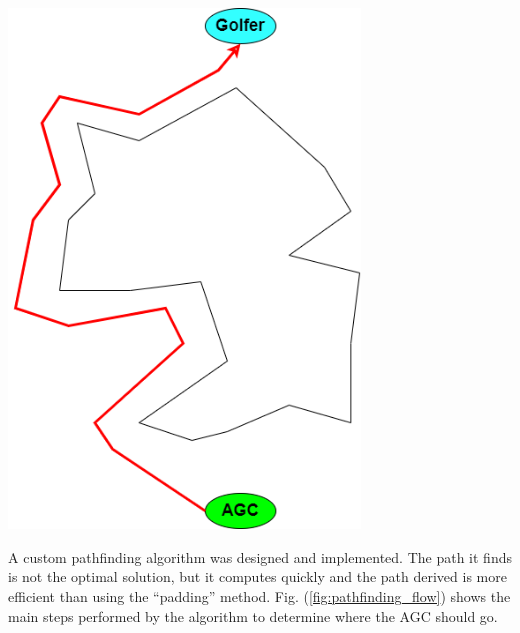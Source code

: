 \documentclass[11pt,landscape]{article}
\newenvironment{Figure}
  {\par\medskip\noindent\minipage{\linewidth}}
  {\endminipage\par\medskip}
\begin{document}
\begin{multicols}{3}
\begin{Figure}
    \begin{mdframed}
        \begin{center}
            \includegraphics[width=0.7\textwidth]{padding.png}
        \end{center}
    \end{mdframed}
    \label{fig:padding}
\end{Figure}

A custom pathfinding algorithm was designed and implemented. The path it finds
is not the optimal solution, but it computes quickly and the path derived is
more efficient than using the ``padding'' method. Fig.
(\ref{fig:pathfinding_flow}) shows the main steps performed by the algorithm to
determine where the AGC should go.


\end{multicols}
\end{document}
